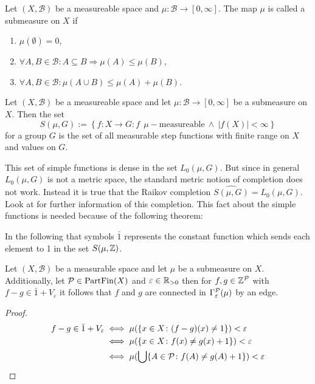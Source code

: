 \begin{defin}
  Let $(X, \mathcal{B})$ be a measureable space and $\mu\colon \mathcal{B} \to [0, \infty]$. The map $\mu$ is called a submeasure on $X$ if
  \begin{enumerate}
    \item $\mu(\emptyset) = 0$,
    \item $\forall A, B \in \mathcal{B}\colon A \subseteq B \Rightarrow \mu(A) \leq \mu(B)$,
    \item $\forall A, B \in \mathcal{B}\colon \mu(A \cup B) \leq \mu(A) + \mu(B)$.
  \end{enumerate}
\end{defin}

\begin{defin}
  Let $(X, \mathcal{B})$ be a measureable space and let $\mu\colon \mathcal{B} \to [0, \infty]$ be a submeasure on $X$. Then the set
  \begin{equation*}
    S(\mu, G) := \left\{ f: X \to G\colon f \:\:\mu-\text{measureable} \: \land \: \left| f(X) \right| < \infty \right\}
  \end{equation*}
  for a group $G$ is the set of all measurable step functions with finite range on $X$ and values on $G$.
\end{defin}

This set of simple functions is dense in the set $L_0(\mu, G)$. But since in general $L_0(\mu, G)$ is not a metric space, the standard metric notion of completion does not work. Instead it is true that the Raikov completion $\widehat{S(\mu, G)} = L_0(\mu, G)$. Look at \cite{} for further information of this completion. This fact about the simple functions is needed because of the following theorem:
\begin{thm}
  
\end{thm}

In the following that symbols $\bar{1}$ represents the constant function which sends each element to 1 in the set $S(\mu, \Z)$. 

\begin{lemma}
  Let $(X, \mathcal{B})$ be a measurable space and let $\mu$ be a submeasure on $X$. Additionally, let $\P \in {\rm PartFin}(X)$ and $\varepsilon \in \R_{>0}$ then for $f,g \in \Z^\P$ with $f - g \in \bar{1} + V_\varepsilon$ it follows that $f$ and $g$ are connected in $\Gamma_\varepsilon^\P(\mu)$ by an edge.
\end{lemma}

\begin{proof}
  \begin{align*}
    f - g \in \bar{1} + V_\varepsilon   &\iff \mu(\{x \in X\colon (f-g)(x) \neq 1\}) < \varepsilon \\
                                      &\iff \mu(\{x \in X\colon f(x) \neq g(x) + 1\}) < \varepsilon \\
                                      &\iff \mu(\bigcup \{A \in \P \colon f(A) \neq g(A) + 1\}) < \varepsilon
  \end{align*}
\end{proof}

